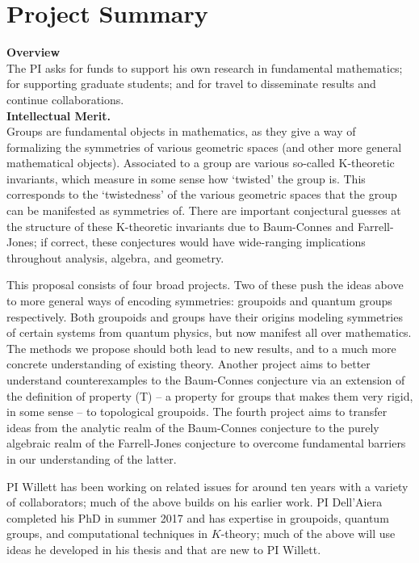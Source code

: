 \documentclass[11pt]{article}
\begin{document}
\section*{Project Summary}


\textbf{Overview}\\
The PI asks for funds to support his own research in fundamental mathematics; for supporting graduate students; and for travel to disseminate results and continue collaborations.\\

\noindent\textbf{Intellectual Merit.}\\
Groups are fundamental objects in mathematics, as they give a way of formalizing the symmetries of various geometric spaces (and other more general mathematical objects).   Associated to a group are various so-called K-theoretic invariants, which measure in some sense how `twisted' the group is.  This corresponds to the `twistedness' of the various geometric spaces that the group can be manifested as symmetries of.  There are important conjectural guesses at the structure of these K-theoretic invariants due to Baum-Connes and Farrell-Jones; if correct, these conjectures would have wide-ranging implications throughout analysis, algebra, and geometry.

This proposal consists of four broad projects.  Two of these push the ideas above to more general ways of encoding symmetries: groupoids and quantum groups respectively.  Both groupoids and groups have their origins modeling symmetries of certain systems from quantum physics, but now manifest all over mathematics.  The methods we propose should both lead to new results, and to a much more concrete understanding of existing theory.  Another project aims to better understand counterexamples to the Baum-Connes conjecture via an extension of the definition of property (T) -- a property for groups that makes them very rigid, in some sense -- to topological groupoids.  The fourth project aims to transfer ideas from the analytic realm of the Baum-Connes conjecture to the purely algebraic realm of the Farrell-Jones conjecture to overcome fundamental barriers in our understanding of the latter.

PI Willett has been working on related issues for around ten years with a variety of collaborators; much of the above builds on his earlier work.  PI Dell'Aiera completed his PhD in summer 2017 and has expertise in groupoids, quantum groups, and computational techniques in $K$-theory; much of the above will use ideas he developed in his thesis and that are new to PI Willett.\\
\end{document}
